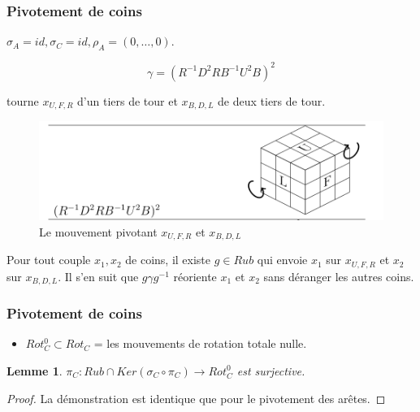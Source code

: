 \documentclass[10pt,notheorems]{beamer}
\theoremstyle{plain}
\theoremstyle{definition}
\theoremstyle{plain}
\theoremstyle{plain}
\newtheorem{lemma}{Lemme}
\theoremstyle{plain}
\theoremstyle{remark}
\begin{document}
\begin{frame}
  \frametitle{Pivotement de coins}
  $\sigma_A = id, \sigma_C = id, \rho_A = (0, \dots, 0)$.

  $$ \gamma = (R ^{-1}  D ^2 RB ^{-1} U ^2 B) ^2 $$

  tourne $x _{U,F,R}$ d'un tiers de tour et $x _{B,D,L}$ de deux tiers de tour.

  \begin{figure}[h!]
    \centering
    \includegraphics[scale=0.2]{figures/pivote_2_coins.png}
    \caption{Le mouvement pivotant $x _{U,F,R}$ et $x _{B,D,L}$}
    \label{pivote_2_coins}
  \end{figure}

  Pour tout couple $x_1, x_2$ de coins, il existe $g \in Rub$ qui envoie $x_1$ sur $x _{U,F,R}$ et $x_2 $ sur $x _{B,D,L}$. Il s'en suit que $g \gamma g ^{-1} $ réoriente $x_1$ et $x_2$ sans déranger les autres coins.
\end{frame}


\begin{frame}
  \frametitle{Pivotement de coins}

  \begin{itemize}
    \item $Rot_C ^{0} \subset Rot_C$ = les mouvements de rotation totale nulle.
  \end{itemize}

  \begin{lemma}
    $\pi_C : Rub \cap Ker(\sigma_C \circ \pi_C) \to Rot_C ^{0}$ est surjective.
  \end{lemma}

  \begin{proof}
    La démonstration est identique que pour le pivotement des arêtes.
  \end{proof}
\end{frame}
\end{document}
